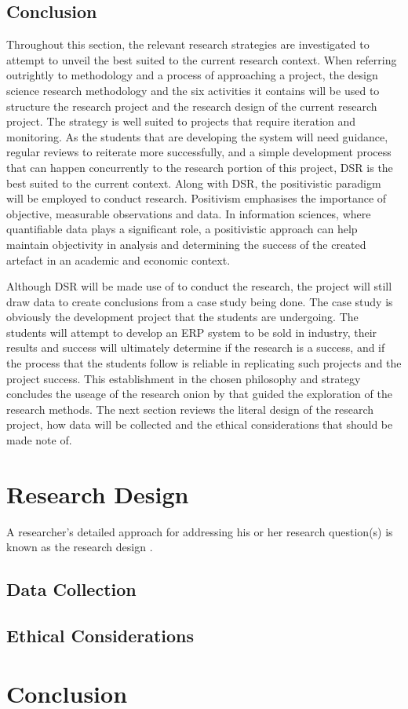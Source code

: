 \subsection{Conclusion}
\par{Throughout this section, the relevant research strategies are investigated to attempt to unveil the best suited to the current research context. When referring outrightly to methodology and a process of approaching a project, the design science research methodology and the six activities it contains will be used to structure the research project and the research design of the current research project. The strategy is well suited to projects that require iteration and monitoring. As the students that are developing the system will need guidance, regular reviews to reiterate more successfully, and a simple development process that can happen concurrently to the research portion of this project, DSR is the best suited to the current context. Along with DSR, the positivistic paradigm will be employed to conduct research. Positivism emphasises the importance of objective, measurable observations and data. In information sciences, where quantifiable data plays a significant role, a positivistic approach can help maintain objectivity in analysis and determining the success of the created artefact in an academic and economic context.}
\par{Although DSR will be made use of to conduct the research, the project will still draw data to create conclusions from a case study being done. The case study is obviously the development project that the students are undergoing. The students will attempt to develop an ERP system to be sold in industry, their results and success will ultimately determine if the research is a success, and if the process that the students follow is reliable in replicating such projects and the project success. This establishment in the chosen philosophy and strategy concludes the useage of the research onion by \cite{mardiana2020modifying} that guided the exploration of the research methods. The next section reviews the literal design of the research project, how data will be collected and the ethical considerations that should be made note of. }


\section{Research Design}
A researcher's detailed approach for addressing his or her research question(s) is known as the research design \citep{mardiana2020modifying}.
\subsection{Data Collection}
\subsection{Ethical Considerations}


\section{Conclusion}
